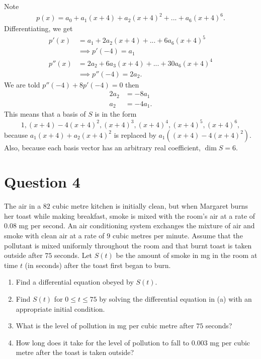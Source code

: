 \documentclass{article}
\begin{document}
Note  
\begin{align*}
  p(x) = a_0 + a_1(x+4) + a_2(x+4)^2 +...+ a_6(x+4)^6. 
\end{align*}
Differentiating, we get 
\begin{align*}
  p'(x) &= a_1 + 2a_2(x + 4) + ... + 6a_6(x + 4)^5 \\
  &\implies p'(-4) = a_1\\
  p''(x) &= 2a_2 + 6a_3(x + 4) + ... + 30a_6(x + 4)^4\\
  &\implies p''(-4) = 2a_2.
\end{align*} 
We are told $p''(-4) + 8p'(-4) = 0$ then 
\begin{align*}
  2a_2 &= -8a_1 \\
  a_2 &= -4a_1.
\end{align*}
This means that a basis of $S$ is in the form
\begin{equation*}
  1, (x+4) - 4(x+4)^2, (x+4)^3, (x+4)^4, (x+4)^5, (x+4)^6,
\end{equation*}
because $a_1(x+4) + a_2(x+4)^2$ is replaced by 
$a_1((x+4) - 4(x+4)^2)$.
Also, because each basis vector has an arbitrary real coefficient, $\dim S=6$.
\newpage
\section*{Question 4}

The air in a $82$ cubic metre kitchen is initially clean, 
but when Margaret burns her toast while making breakfast, 
smoke is mixed with the room's air at a rate of $0.08$
mg per second. An air conditioning system exchanges the 
mixture of air and smoke with clean air at a rate of $9$
cubic metres per minute.  Assume that the pollutant is 
mixed uniformly throughout the room and that burnt toast 
is taken outside after $75$ seconds. Let $S(t)$
be the amount of smoke in mg in the room at time $t$
(in seconds) after the toast first began to burn.
\begin{enumerate}[label=\alph*)]
  \item Find a differential equation obeyed by $S(t)$.
  \item Find $S(t)$ for $0 \leq t \leq 75$
  by solving the differential equation in (a)
  with an appropriate initial condition.
  \item What is the level of pollution in mg per
  cubic metre after $75$ seconds?
  \item How long does it take for the level of pollution 
  to fall to $0.003$
  mg per cubic metre after the toast is taken outside?
\end{enumerate}
\end{document}
